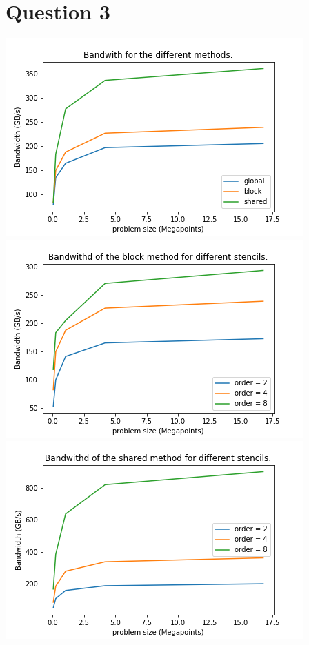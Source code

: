 \documentclass[12pt,letterpaper,twoside]{article}
\begin{document}
 	\section*{Question 3}
 	\includegraphics{3-1.png}\\
 	\includegraphics{3-2.png}\\
 	\includegraphics{3-3.png}
\end{document}
